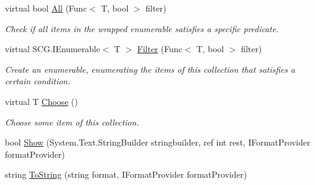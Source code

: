 \begin{DoxyCompactItemize}
\item 
virtual bool \hyperlink{class_c5_1_1_guarded_collection_value_a0fda465306c55a4dde41b5eecdb1180a}{All} (Func$<$ T, bool $>$ filter)
\begin{DoxyCompactList}\small\item\em Check if all items in the wrapped enumerable satisfies a specific predicate. \end{DoxyCompactList}\item 
virtual S\+C\+G.\+I\+Enumerable$<$ T $>$ \hyperlink{class_c5_1_1_guarded_collection_value_a69ab914af51ee2fefc9a0e874e544b3f}{Filter} (Func$<$ T, bool $>$ filter)
\begin{DoxyCompactList}\small\item\em Create an enumerable, enumerating the items of this collection that satisfies a certain condition. \end{DoxyCompactList}\item 
virtual T \hyperlink{class_c5_1_1_guarded_collection_value_ac1c427d873e650f819d6c662515dadd1}{Choose} ()
\begin{DoxyCompactList}\small\item\em Choose some item of this collection. \end{DoxyCompactList}\item 
bool \hyperlink{class_c5_1_1_guarded_collection_value_afa61d34466d122adfde482979c147e9c}{Show} (System.\+Text.\+String\+Builder stringbuilder, ref int rest, I\+Format\+Provider format\+Provider)
\item 
string \hyperlink{class_c5_1_1_guarded_collection_value_aa77b66d63ed61af80e8bffbfb86a6929}{To\+String} (string format, I\+Format\+Provider format\+Provider)
\end{DoxyCompactItemize}
